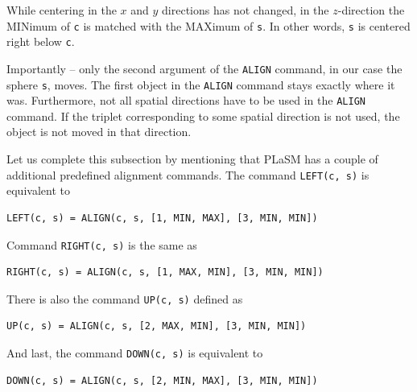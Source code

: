\noindent
While centering in the $x$ and $y$ directions has not changed, in the $z$-direction 
the MINimum of {\tt c} is matched with the MAXimum of {\tt s}. In other words,
{\tt s} is centered right below {\tt c}. 

Importantly -- only the second argument of the {\tt ALIGN} command, in our case the sphere {\tt s}, moves. The first 
object in the {\tt ALIGN} command stays exactly where it was. Furthermore, not all spatial directions 
have to be used in the {\tt ALIGN} command. If the triplet corresponding to some spatial direction 
is not used, the object is not moved in that direction. 

Let us complete this subsection by mentioning that PLaSM has a couple of additional
predefined alignment commands. The command {\tt LEFT(c, s)} is equivalent to\\

\begin{bbox}
\begin{verbatim}
LEFT(c, s) = ALIGN(c, s, [1, MIN, MAX], [3, MIN, MIN])
\end{verbatim}
\end{bbox}
\vspace{6mm}

\noindent
Command {\tt RIGHT(c, s)} is the same as\\

\begin{bbox}
\begin{verbatim}
RIGHT(c, s) = ALIGN(c, s, [1, MAX, MIN], [3, MIN, MIN])
\end{verbatim}
\end{bbox}
\vspace{6mm}

\noindent
There is also the command {\tt UP(c, s)} defined as\\

\begin{bbox}
\begin{verbatim}
UP(c, s) = ALIGN(c, s, [2, MAX, MIN], [3, MIN, MIN])
\end{verbatim}
\end{bbox}
\vspace{6mm}

\noindent
And last, the command {\tt DOWN(c, s)} is equivalent to\\

\begin{bbox}
\begin{verbatim}
DOWN(c, s) = ALIGN(c, s, [2, MIN, MAX], [3, MIN, MIN])
\end{verbatim}
\end{bbox}
\vspace{6mm}

